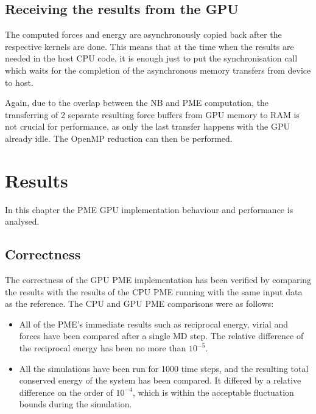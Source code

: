 \documentclass[12pt,a4paper]{report}
\newcommand{\draft}[1]{#1}
\begin{document}
\section{Receiving the results from the GPU}
The computed forces and energy are asynchronously copied back after the respective kernels are done. This means that at the time when the results are needed in the host CPU code, it is enough just to put the synchronisation call which waits for the completion of the asynchronous memory transfers from device to host.

Again, due to the overlap between the NB and PME computation, the transferring of 2 separate resulting force buffers from GPU memory to RAM is not crucial for performance, as only the last transfer happens with the GPU already idle. The OpenMP reduction can then be performed.

\newpage
\chapter{Results}

In this chapter the PME GPU implementation behaviour and performance is analysed.

\section{Correctness}
The correctness of the GPU PME implementation has been verified by comparing the results with the results of the CPU PME running with the same input data as the reference.
The CPU and GPU PME comparisons were as follows:
\begin{itemize}
\item All of the PME's immediate results such as reciprocal energy, virial and forces have been compared after a single MD step. The relative difference of the reciprocal energy has been no more than $10^{-5}$. 


\item All the simulations have been run for 1000 time steps, and the resulting total conserved energy of the system has been compared. It differed by a relative difference on the order of $10^{-4}$, which is within the acceptable fluctuation bounds during the simulation.
\end{itemize} 
\end{document}
